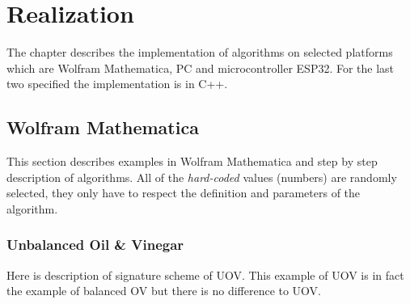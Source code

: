 \documentclass[thesis=M,english]{FITthesis}[2019/12/23]
\begin{document}
\chapter{Realization}
The chapter describes the implementation of algorithms on selected platforms which are Wolfram Mathematica, PC and microcontroller ESP32. For the last two specified the implementation is in C++.

\section{Wolfram Mathematica}
This section describes examples in Wolfram Mathematica and step by step description of algorithms. All of the \textit{hard-coded} values (numbers) are randomly selected, they only have to respect the definition and parameters of the algorithm.  

\subsection{Unbalanced Oil \& Vinegar}
Here is description of signature scheme of UOV. This example of UOV is in fact the example of balanced OV but there is no difference to UOV.
\end{document}
